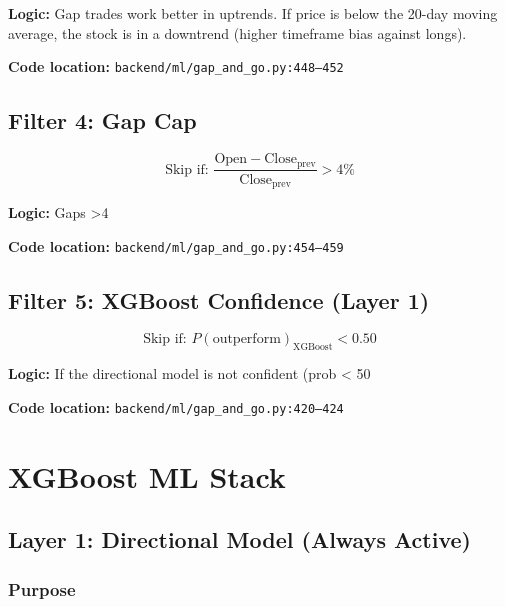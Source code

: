 \documentclass[11pt,a4paper]{article}
\begin{document}
\textbf{Logic:} Gap trades work better in uptrends. If price is below the 20-day moving average, the stock is in a downtrend (higher timeframe bias against longs).

\textbf{Code location:} \texttt{backend/ml/gap\_and\_go.py:448–452}

\subsection{Filter 4: Gap Cap}

\begin{equation}
\text{Skip if: } \frac{\text{Open} - \text{Close}_{\text{prev}}}{\text{Close}_{\text{prev}}} > 4\%
\end{equation}

\textbf{Logic:} Gaps >4%

\textbf{Code location:} \texttt{backend/ml/gap\_and\_go.py:454–459}

\subsection{Filter 5: XGBoost Confidence (Layer 1)}

\begin{equation}
\text{Skip if: } P(\text{outperform})_{\text{XGBoost}} < 0.50
\end{equation}

\textbf{Logic:} If the directional model is not confident (prob < 50%

\textbf{Code location:} \texttt{backend/ml/gap\_and\_go.py:420–424}

\section{XGBoost ML Stack}

\subsection{Layer 1: Directional Model (Always Active)}

\subsubsection{Purpose}
\end{document}
